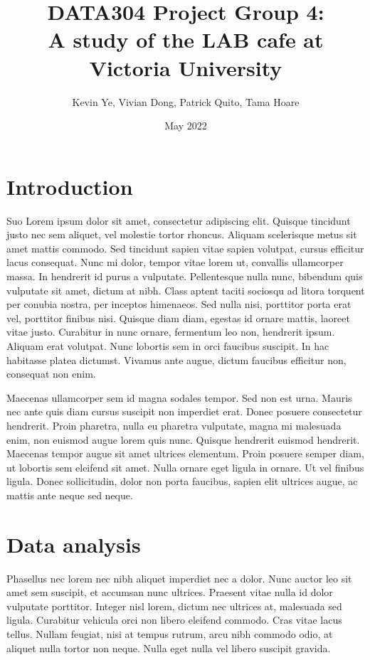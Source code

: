 \documentclass{article}
\title{\Huge DATA304 Project Group 4:\\
  \Huge A study of the LAB cafe at Victoria University}
\author{\Large Kevin Ye, Vivian Dong, Patrick Quito, Tama Hoare }
\date{\Large May 2022}
\begin{document}
\maketitle
\newpage

\section{Introduction}
Suo Lorem ipsum dolor sit amet, consectetur adipiscing elit. Quisque tincidunt justo nec sem aliquet, vel molestie tortor rhoncus. Aliquam scelerisque metus sit amet mattis commodo. Sed tincidunt sapien vitae sapien volutpat, cursus efficitur lacus consequat. Nunc mi dolor, tempor vitae lorem ut, convallis ullamcorper massa. In hendrerit id purus a vulputate. Pellentesque nulla nunc, bibendum quis vulputate sit amet, dictum at nibh. Class aptent taciti sociosqu ad litora torquent per conubia nostra, per inceptos himenaeos. Sed nulla nisi, porttitor porta erat vel, porttitor finibus nisi. Quisque diam diam, egestas id ornare mattis, laoreet vitae justo. Curabitur in nunc ornare, fermentum leo non, hendrerit ipsum. Aliquam erat volutpat. Nunc lobortis sem in orci faucibus suscipit. In hac habitasse platea dictumst. Vivamus ante augue, dictum faucibus efficitur non, consequat non enim.


\noindent Maecenas ullamcorper sem id magna sodales tempor. Sed non est urna. Mauris nec ante quis diam cursus suscipit non imperdiet erat. Donec posuere consectetur hendrerit. Proin pharetra, nulla eu pharetra vulputate, magna mi malesuada enim, non euismod augue lorem quis nunc. Quisque hendrerit euismod hendrerit. Maecenas tempor augue sit amet ultrices elementum. Proin posuere semper diam, ut lobortis sem eleifend sit amet. Nulla ornare eget ligula in ornare. Ut vel finibus ligula. Donec sollicitudin, dolor non porta faucibus, sapien elit ultrices augue, ac mattis ante neque sed neque.

\section{Data analysis}
Phasellus nec lorem nec nibh aliquet imperdiet nec a dolor. Nunc auctor leo sit amet sem suscipit, et accumsan nunc ultrices. Praesent vitae nulla id dolor vulputate porttitor. Integer nisl lorem, dictum nec ultrices at, malesuada sed ligula. Curabitur vehicula orci non libero eleifend commodo. Cras vitae lacus tellus. Nullam feugiat, nisi at tempus rutrum, arcu nibh commodo odio, at aliquet nulla tortor non neque. Nulla eget nulla vel libero suscipit gravida.
\end{document}
